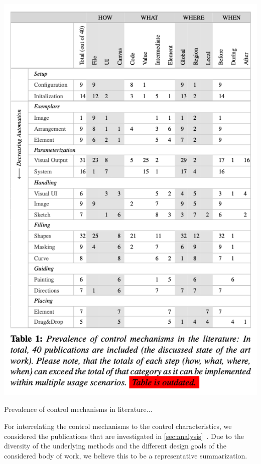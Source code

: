 \begin{table}
    \centering
    \includegraphics[width=\linewidth]{tables/table_controlmechanism.png}
    \caption{Prevalence of control mechanisms in literature... }
\end{table}



For interrelating the control mechanisms to the control characteristics, we considered the publications that are investigated in \cref{sec:analysis}~. Due to the diversity of the underlying methods and the different design goals of the considered body of work, we believe this to be a representative summarization.

